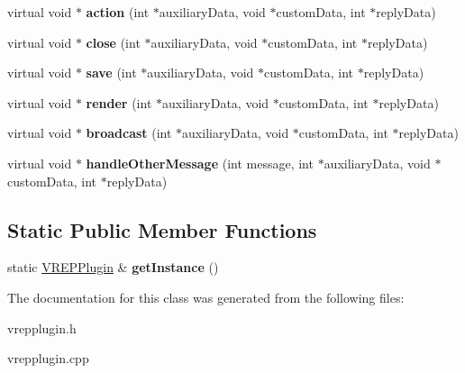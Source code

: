 \begin{DoxyCompactItemize}
\item 
virtual void $\ast$ {\bfseries action} (int $\ast$auxiliary\+Data, void $\ast$custom\+Data, int $\ast$reply\+Data)\hypertarget{classVREPPlugin_a048e1fbf7b4b5b7b96ea6ec132218e12}{}\label{classVREPPlugin_a048e1fbf7b4b5b7b96ea6ec132218e12}

\item 
virtual void $\ast$ {\bfseries close} (int $\ast$auxiliary\+Data, void $\ast$custom\+Data, int $\ast$reply\+Data)\hypertarget{classVREPPlugin_af9fc2e6b9adf1436fc06e2555eaa3c2b}{}\label{classVREPPlugin_af9fc2e6b9adf1436fc06e2555eaa3c2b}

\item 
virtual void $\ast$ {\bfseries save} (int $\ast$auxiliary\+Data, void $\ast$custom\+Data, int $\ast$reply\+Data)\hypertarget{classVREPPlugin_af6a19ea1a3fbe91a86df1e92e6f623a2}{}\label{classVREPPlugin_af6a19ea1a3fbe91a86df1e92e6f623a2}

\item 
virtual void $\ast$ {\bfseries render} (int $\ast$auxiliary\+Data, void $\ast$custom\+Data, int $\ast$reply\+Data)\hypertarget{classVREPPlugin_a3fce674766334a4ad6c63a179dff64ae}{}\label{classVREPPlugin_a3fce674766334a4ad6c63a179dff64ae}

\item 
virtual void $\ast$ {\bfseries broadcast} (int $\ast$auxiliary\+Data, void $\ast$custom\+Data, int $\ast$reply\+Data)\hypertarget{classVREPPlugin_aa04f0d2bb1b0d73a46a99e699e11830f}{}\label{classVREPPlugin_aa04f0d2bb1b0d73a46a99e699e11830f}

\item 
virtual void $\ast$ {\bfseries handle\+Other\+Message} (int message, int $\ast$auxiliary\+Data, void $\ast$custom\+Data, int $\ast$reply\+Data)\hypertarget{classVREPPlugin_af3a92d9202afe61bf4979d0e24bd5425}{}\label{classVREPPlugin_af3a92d9202afe61bf4979d0e24bd5425}

\end{DoxyCompactItemize}
\subsection*{Static Public Member Functions}
\begin{DoxyCompactItemize}
\item 
static \hyperlink{classVREPPlugin}{V\+R\+E\+P\+Plugin} \& {\bfseries get\+Instance} ()\hypertarget{classVREPPlugin_a6c54bebcd2d0c09e7a20dd72ae82ec71}{}\label{classVREPPlugin_a6c54bebcd2d0c09e7a20dd72ae82ec71}

\end{DoxyCompactItemize}


The documentation for this class was generated from the following files\+:\begin{DoxyCompactItemize}
\item 
vrepplugin.\+h\item 
vrepplugin.\+cpp\end{DoxyCompactItemize}
